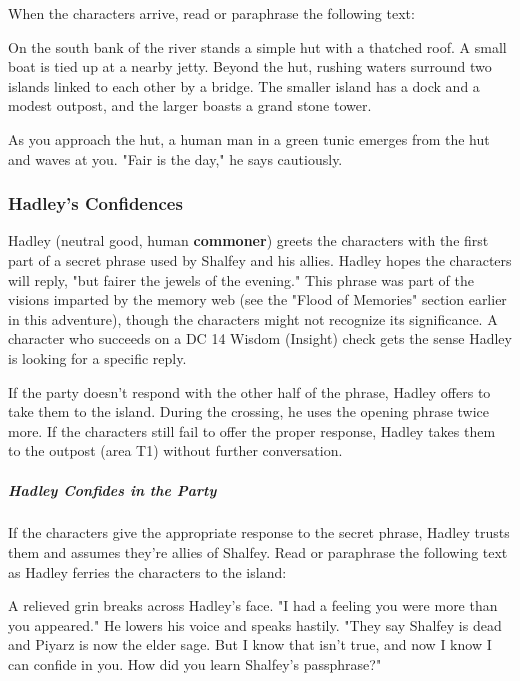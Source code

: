 \documentclass[10pt,a4paper,twoside,bg=print,twocolumn,openany,nodeprecatedcode]{dndbook}
\begin{document}
When the characters arrive, read or paraphrase the following text:

\begin{DndReadAloud}{}
On the south bank of the river stands a simple hut with a thatched roof. A small boat is tied up at a nearby jetty. Beyond the hut, rushing waters surround two islands linked to each other by a bridge. The smaller island has a dock and a modest outpost, and the larger boasts a grand stone tower.

As you approach the hut, a human man in a green tunic emerges from the hut and waves at you. "Fair is the day," he says cautiously.

\end{DndReadAloud}

\subsubsection{Hadley's Confidences}
Hadley (neutral good, human \textbf{commoner}) greets the characters with the first part of a secret phrase used by Shalfey and his allies. Hadley hopes the characters will reply, "but fairer the jewels of the evening." This phrase was part of the visions imparted by the memory web (see the "Flood of Memories" section earlier in this adventure), though the characters might not recognize its significance. A character who succeeds on a DC 14 Wisdom (Insight) check gets the sense Hadley is looking for a specific reply.

If the party doesn't respond with the other half of the phrase, Hadley offers to take them to the island. During the crossing, he uses the opening phrase twice more. If the characters still fail to offer the proper response, Hadley takes them to the outpost (area T1) without further conversation.

\subparagraph{Hadley Confides in the Party}
If the characters give the appropriate response to the secret phrase, Hadley trusts them and assumes they're allies of Shalfey. Read or paraphrase the following text as Hadley ferries the characters to the island:

\begin{DndReadAloud}{}
A relieved grin breaks across Hadley's face. "I had a feeling you were more than you appeared." He lowers his voice and speaks hastily. "They say Shalfey is dead and Piyarz is now the elder sage. But I know that isn't true, and now I know I can confide in you. How did you learn Shalfey's passphrase?"

\end{DndReadAloud}
\end{document}
